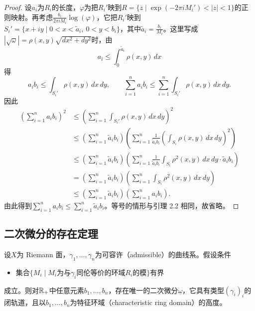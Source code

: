 

\begin{proof}
设$a_i$为$R_i$的长度，$\varphi$为把$R_i'$映到$R=\{z\mid\exp(-2\pi iM_i')<|z|<1\}$的正则映射。再考虑$\frac{b_i}{2\pi iM_i}\log(\varphi)$，它把$R_i'$映到$S_i'=\{x+iy\mid0<x<\tilde a_i,\ 0<y<b_i\}$，其中$\tilde a_i=\frac{b_i}{M_i}$。这里写成$|\sqrt{\omega}|=\rho(x,y)\sqrt{dx^2+dy^2}$时，由
\[
a_i\le\int_0^{\tilde a_i}\rho(x,y)\,dx
\]
得
\[
a_ib_i\le\int_{S_i'}\rho(x,y)\,dx\,dy,\qquad
\sum_{i=1}^n a_ib_i\le\sum_{i=1}^n\int_{S_i'}\rho(x,y)\,dx\,dy.
\]
因此
\[
\begin{aligned}
\left(\sum_{i=1}^n a_ib_i\right)^2
&\le\left(\sum_{i=1}^n\int_{S_i'}\rho(x,y)\,dx\,dy\right)^2\\
&\le\left(\sum_{i=1}^n\tilde a_ib_i\right)
 \left(\sum_{i=1}^n\frac{1}{\tilde a_ib_i}
 \left(\int_{S_i}\rho(x,y)\,dx\,dy\right)^2\right)\\
&\le\left(\sum_{i=1}^n\tilde a_ib_i\right)
 \left(\sum_{i=1}^n\frac{1}{\tilde a_ib_i}
 \int_{S_i}\rho^2(x,y)\,dx\,dy\cdot\tilde a_ib_i\right)\\
&=\left(\sum_{i=1}^n\tilde a_ib_i\right)
 \left(\sum_{i=1}^n\int_{S_i}\rho^2(x,y)\,dx\,dy\right)\\
&\le\left(\sum_{i=1}^n\tilde a_ib_i\right)
 \left(\sum_{i=1}^n a_ib_i\right).
\end{aligned}
\]
由此得到$\sum_{i=1}^n a_ib_i\le\sum_{i=1}^n\tilde a_ib_i$。等号的情形与引理 2.2 相同，故省略。
\end{proof}


\subsection{二次微分的存在定理}

\begin{theorem}
设$X$为 Riemann 面，$\gamma_1,\dots,\gamma_n$为可容许（admissible）的曲线系。假设条件
\begin{itemize}[leftmargin=3.2em,itemsep=2pt,topsep=4pt]
\item[(fin)] 集合$\{M_i\mid M_i$为与$\gamma_i$同伦等价的环域$R_i$的模$\}$有界
\end{itemize}
成立。则对$\mathbb{R}_+$中任意元素$b_1,\dots,b_n$，存在唯一的二次微分$\omega$，它具有类型$(\gamma_i)_i$的闭轨道，且以$b_1,\dots,b_n$为特征环域（characteristic ring domain）的高度。
\end{theorem}

